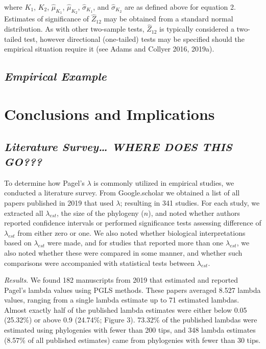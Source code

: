 \documentclass[
]{article}
\begin{document}
where \(K_1\), \(K_2\), \(\hat\mu_{K_1}\), \(\hat\mu_{K_2}\),
\(\hat\sigma_{K_1}\), and \(\hat\sigma_{K_2}\) are as defined above for
equation 2. Estimates of significance of \(\hat{Z}_{12}\) may be
obtained from a standard normal distribution. As with other two-sample
tests, \(\hat{Z}_{12}\) is typically considered a two-tailed test,
however directional (one-tailed) tests may be specified should the
empirical situation require it (see Adams and Collyer 2016, 2019a).

\hypertarget{empirical-example}{%
\subsection{\texorpdfstring{\emph{Empirical
Example}}{Empirical Example}}\label{empirical-example}}

\hypertarget{conclusions-and-implications}{%
\section{Conclusions and
Implications}\label{conclusions-and-implications}}

\hypertarget{literature-survey-where-does-this-go}{%
\subsection{\texorpdfstring{\emph{Literature Survey\ldots{} WHERE DOES
THIS
GO???}}{Literature Survey\ldots{} WHERE DOES THIS GO???}}\label{literature-survey-where-does-this-go}}

To determine how Pagel's \(\lambda\) is commonly utilized in empirical
studies, we conducted a literature survey. From Google.scholar we
obtained a list of all papers published in 2019 that used \(\lambda\);
resulting in 341 studies. For each study, we extracted all
\(\lambda_{est}\), the size of the phylogeny (\(n\)), and noted whether
authors reported confidence intervals or performed significance tests
assessing difference of \(\lambda_{est}\) from either zero or one. We
also noted whether biological interpretations based on \(\lambda_{est}\)
were made, and for studies that reported more than one
\(\lambda_{est}\), we also noted whether these were compared in some
manner, and whether such comparisons were accompanied with statistical
tests between \(\lambda_{est}\).

\emph{Results}. We found 182 manuscripts from 2019 that estimated and
reported Pagel's lambda values using PGLS methods. These papers averaged
8.527 lambda values, ranging from a single lambda estimate up to 71
estimated lambdas. Almost exactly half of the published lambda estimates
were either below 0.05 (25.32\%) or above 0.9 (24.74\%; Figure 3).
73.32\% of the published lambdas were estimated using phylogenies with
fewer than 200 tips, and 348 lambda estimates (8.57\% of all published
estimates) came from phylogenies with fewer than 30 tips. \hfill\break
\end{document}
